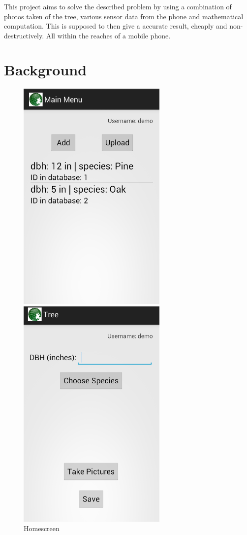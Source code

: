 This project aims to solve the described problem by using a combination of photos taken of the tree, various sensor data from the phone and mathematical computation. This is supposed to then give a accurate result, cheaply and non-destructively. All within the reaches of a mobile phone.

\section{Background}

\begin{figure}[!htb]
		\centering
  		\includegraphics[width=0.65\textwidth]{main.png}
	  	\caption{Homescreen}
  		\label{main}
	\endminipage\hfill
		\centering
	  	\includegraphics[width=0.65\textwidth]{input.png}

\end{figure}
